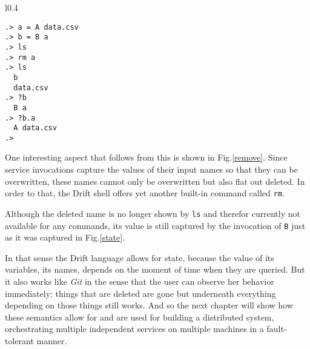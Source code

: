 \begin{wrapfigure}{l}{0.4\textwidth}
  \begin{lstlisting}
.> a = A data.csv
.> b = B a
.> ls
.> rm a
.> ls
  b
  data.csv
.> ?b
  B a
.> ?b.a
  A data.csv
.>
  \end{lstlisting}
  \caption{Example showing how names can be removed.}
  \label{remove}
\end{wrapfigure}

One interesting aspect that follows from this is shown in Fig.\ref{remove}.
Since service invocations capture the values of their input names
so that they can be overwritten, these names cannot only
be overwritten but also flat out deleted. In order to that, the
Drift shell offers yet another built-in command called \texttt{rm}.

Although the deleted name is no longer shown by \texttt{ls} and
therefor currently not available for any commands, its value is
still captured by the invocation of \texttt{B} just as it was
captured in Fig.\ref{state}.

In that sense the Drift language allows for state, because the value
of its variables, its names, depends on the moment of time when they
are queried. But it also works like \textit{Git} in the sense that
the user can observe her behavior immediately: things that are deleted
are gone but underneath everything depending on those things still
works.
And so the next chapter will show how these semantics allow for
and are used for building a distributed system, orchestrating
multiple independent services on multiple machines in a fault-tolerant
manner.


